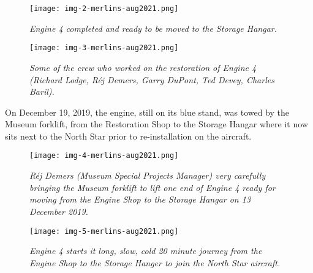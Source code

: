 \begin{figure}[H]
    \vspace{2em}
    \centering
    \texttt{[image: img-2-merlins-aug2021.png]}
    \caption*{\small \em Engine 4 completed and ready to be moved to the Storage Hangar.}
    \label{fig:img2}
 \end{figure}

 \begin{figure}[H]
    \vspace{2em}
    \centering
    \texttt{[image: img-3-merlins-aug2021.png]}
    \caption*{\small \em Some of the crew who worked on the restoration of Engine 4 (Richard Lodge, R\'{e}j Demers, Garry DuPont, Ted Devey, Charles Baril).}
    \label{fig:img3}
 \end{figure}

On December 19, 2019, the engine, still on its blue stand, was towed by the
Museum forklift, from the Restoration Shop to the Storage Hangar where it now
sits next to the North Star prior to re-installation on the aircraft.

\begin{figure}[H]
    \vspace{2em}
    \centering
    \texttt{[image: img-4-merlins-aug2021.png]}
    \caption*{\small \em R\'{e}j Demers (Museum Special Projects Manager) very carefully bringing the Museum forklift to lift one end of Engine 4 ready for moving from the Engine Shop to the Storage Hangar on 13 December 2019.}
    \label{fig:img4}
 \end{figure}

 \begin{figure}[H]
    \vspace{2em}
    \centering
    \texttt{[image: img-5-merlins-aug2021.png]}
    \caption*{\small \em Engine 4 starts it long, slow, cold 20 minute journey from the Engine Shop to the Storage Hanger to join the North Star aircraft.}
    \label{fig:img5}
 \end{figure}
 
